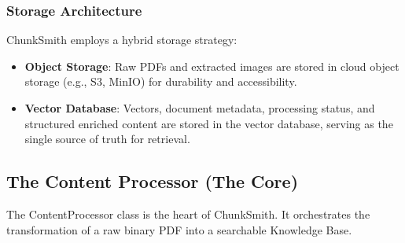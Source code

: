 \documentclass[conference]{IEEEtran}
\begin{document}
\subsubsection{Storage Architecture}
ChunkSmith employs a hybrid storage strategy:
\begin{itemize}
    \item \textbf{Object Storage}: Raw PDFs and extracted images are stored in cloud object storage (e.g., S3, MinIO) for durability and accessibility.
    \item \textbf{Vector Database}: Vectors, document metadata, processing status, and structured enriched content are stored in the vector database, serving as the single source of truth for retrieval.
\end{itemize}

\subsection{The Content Processor (The Core)}
The ContentProcessor class is the heart of ChunkSmith. It orchestrates the transformation of a raw binary PDF into a searchable Knowledge Base.
\end{document}
